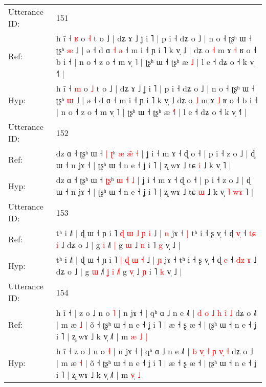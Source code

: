 \documentclass[10pt]{article}
\DeclareRobustCommand{\hl}[1]{{\textcolor{red}{#1}}}
\begin{document}
\begin{longtable}{ll}
 \\
\midrule
Utterance ID: & 151 \\
Ref: & h ĩ ˧ \hl{ʁ} o \hl{˧} t o ˩ | dʑ ɤ ˩ ʝ i ˥ | p i ˧ dʑ o ˩ | n o ˧ ʈʂʰ ɯ ˧ ʈʂʰ \hl{æ} ˩ | ə ˧ d ɑ\hl{ }\hl{˧}\hl{ }\hl{ə} ˧ m i ˧ ɲ i ˥ k v̩ ˩\hl{ }\hl{|} dʑ o \hl{˧} m ɤ \hl{˧} ʁ o ˧ b i ˧ | n o ˧ z o ˧ m v̩ ˥ | ʈʂʰ ɯ ˧ ʈʂʰ æ \hl{}\hl{˩} | l e ˧ dʑ o ˧ k v̩ ˧˥ |
 \\
Hyp: & h ĩ ˧ \hl{m} o \hl{˩} t o ˩ | dʑ ɤ ˩ ʝ i ˥ | p i ˧ dʑ o ˩ | n o ˧ ʈʂʰ ɯ ˧ ʈʂʰ \hl{ɯ} ˩ | ə ˧ d ɑ\hl{}\hl{}\hl{}\hl{} ˧ m i ˧ ɲ i ˥ k v̩ ˩\hl{}\hl{} dʑ o \hl{˩} m ɤ \hl{˩} ʁ o ˧ b i ˧ | n o ˧ z o ˧ m v̩ ˥ | ʈʂʰ ɯ ˧ ʈʂʰ æ \hl{˧}\hl{˥} | l e ˧ dʑ o ˧ k v̩ ˧˥ |
 \\
\midrule
Utterance ID: & 152 \\
Ref: & dz ɑ ˧ ʈʂʰ ɯ ˧ \hl{|}\hl{ }\hl{ʈ}ʰ \hl{æ} \hl{æ}\hl{̃} \hl{˧} | ʝ i ˧ m ɤ ˧ ɖ o ˧ | p i ˧ z o ˩ | ɖ ɯ ˧ n jɤ ˧ | ʈʂʰ ɯ ˧ n e ˧ ʝ i ˥ | ʐ wɤ ˩ tɕ \hl{i} ˩ k v̩\hl{}\hl{}\hl{}\hl{}\hl{} ˥ |
 \\
Hyp: & dz ɑ ˧ ʈʂʰ ɯ ˧ \hl{}\hl{ʈ}\hl{ʂ}ʰ \hl{ɯ} \hl{}\hl{˧} \hl{˩} | ʝ i ˧ m ɤ ˧ ɖ o ˧ | p i ˧ z o ˩ | ɖ ɯ ˧ n jɤ ˧ | ʈʂʰ ɯ ˧ n e ˧ ʝ i ˥ | ʐ wɤ ˩ tɕ \hl{ɯ} ˩ k v̩\hl{ }\hl{˥}\hl{ }\hl{w}\hl{ɤ} ˥ |
 \\
\midrule
Utterance ID: & 153 \\
Ref: & tʰ i ˩˥ | ɖ ɯ ˧ ɲ i ˥\hl{ }\hl{ɖ} \hl{ɯ} \hl{˩} \hl{ɲ} \hl{i} ˩ | \hl{n} jɤ ˧\hl{ }\hl{|} tʰ i ˧ ʂ v̩ ˧ ɖ \hl{v}\hl{̩} ˧ \hl{t}\hl{ɕ} \hl{i} ˩ dʑ o ˩ | g \hl{i} ˩˥\hl{}\hl{}\hl{}\hl{} \hl{}\hl{|} g \hl{}\hl{ɯ} ˩ \hl{n} i ˥ \hl{g} v̩ ˩ |
 \\
Hyp: & tʰ i ˩˥ | ɖ ɯ ˧ ɲ i ˥\hl{}\hl{} \hl{|} \hl{ɖ} \hl{ɯ} \hl{˧} ˩ | \hl{ɲ} jɤ ˧\hl{}\hl{} tʰ i ˧ ʂ v̩ ˧ ɖ \hl{}\hl{e} ˧ \hl{d}\hl{z} \hl{ɤ} ˩ dʑ o ˩ | g \hl{ɯ} ˩˥\hl{ }\hl{ʝ}\hl{ }\hl{i} \hl{˩}\hl{˥} g \hl{v}\hl{̩} ˩ \hl{ɲ} i ˥ \hl{k} v̩ ˩ |
 \\
\midrule
Utterance ID: & 154 \\
Ref: & h ĩ ˧\hl{ }\hl{|} z o ˩ n o \hl{˥} | n jɤ ˧ | qʰ ɑ ˩ n e ˩˥ | \hl{d} \hl{}\hl{o} \hl{˩} \hl{h} \hl{i}\hl{̃} \hl{˩} dʑ o ˩\hl{˥} | m æ \hl{˩} | õ ˧ ʈʂʰ ɯ ˧ n e ˧ ʝ i ˥ | æ ˧ ʂ æ ˧ | ʈʂʰ ɯ ˧ n e ˧ ʝ i ˥ | ʐ wɤ ˩ k v̩ ˩˥ | m \hl{æ}\hl{ }\hl{˩} \hl{|}
 \\
Hyp: & h ĩ ˧\hl{}\hl{} z o ˩ n o \hl{˧} | n jɤ ˧ | qʰ ɑ ˩ n e ˩˥ | \hl{b} \hl{v}\hl{̩} \hl{˧} \hl{ɲ} \hl{v}\hl{̩} \hl{˧} dʑ o ˩\hl{} | m æ \hl{˧} | õ ˧ ʈʂʰ ɯ ˧ n e ˧ ʝ i ˥ | æ ˧ ʂ æ ˧ | ʈʂʰ ɯ ˧ n e ˧ ʝ i ˥ | ʐ wɤ ˩ k v̩ ˩˥ | m \hl{}\hl{v}\hl{̩} \hl{˩}
 \\
\midrule
\end{longtable}
\end{document}
